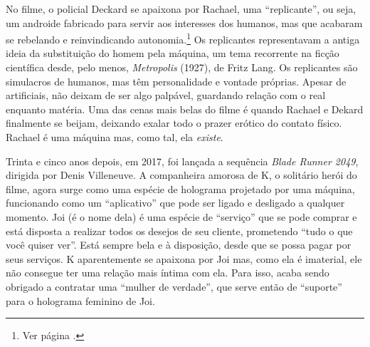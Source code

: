 No filme, o policial Deckard se apaixona por Rachael, uma
``replicante'', ou seja, um androide fabricado para servir aos
interesses dos humanos, mas que acabaram se rebelando e reinvindicando
autonomia.\footnote{Ver página \pageref{replicantes}.} Os replicantes representavam a
antiga ideia da substituição do homem pela máquina, um tema recorrente
na ficção científica desde, pelo menos, \emph{Metropolis} (1927), de
Fritz Lang. Os replicantes são simulacros de humanos, mas têm
personalidade e vontade próprias. Apesar de artificiais, não deixam de
ser algo palpável, guardando relação com o real enquanto matéria. Uma
das cenas mais belas do filme é quando Rachael e Dekard finalmente se
beijam, deixando exalar todo o prazer erótico do contato físico. Rachael
é uma máquina mas, como tal, ela \emph{existe}.

Trinta e cinco anos depois, em 2017, foi lançada a sequência \emph{Blade
Runner 2049}, dirigida por Denis Villeneuve. A companheira amorosa de K,
o solitário herói do filme, agora surge como uma espécie de holograma
projetado por uma máquina, funcionando como um ``aplicativo'' que pode
ser ligado e desligado a qualquer momento. Joi (é o nome dela) é uma
espécie de ``serviço'' que se pode comprar e está disposta a realizar
todos os desejos de seu cliente, prometendo ``tudo o que você quiser
ver''. Está sempre bela e à disposição, desde que se possa pagar por
seus serviços. K aparentemente se apaixona por Joi mas, como ela é
imaterial, ele não consegue ter uma relação mais íntima com ela. Para
isso, acaba sendo obrigado a contratar uma ``mulher de verdade'', que
serve então de ``suporte'' para o holograma feminino de Joi.

